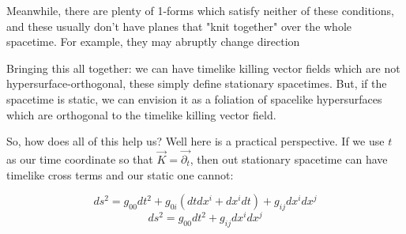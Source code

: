 \documentclass[11pt,table]{article}
\begin{document}
            Meanwhile, there are plenty of 1-forms which satisfy neither of these conditions, and these usually don't have planes that "knit together" over the whole spacetime. For example, they may abruptly change direction
            \vspace{.25in}
            \begin{center}
    




            \end{center}
            Bringing this all together: we can have timelike killing vector fields which are not hypersurface-orthogonal, these simply define stationary spacetimes.  But, if the spacetime is static, we can envision it as a foliation of spacelike hypersurfaces which are orthogonal to the timelike killing vector field.

            So, how does all of this help us?  Well here is a practical perspective.  If we use $t$ as our time coordinate so that $\Vec{K} = \vec{\partial_t}$, then out stationary spacetime can have timelike cross terms and our static one cannot:

            \begin{equation}
                ds^2=g_{00}dt^2 + g_{0i}(dtdx^i+dx^idt)+g_{ij}dx^idx^j\tag{stationary}
            \end{equation}
            \begin{equation}
                ds^2=g_{00}dt^2 +g_{ij}dx^idx^j\tag{static}
            \end{equation}
            \vspace{.25in}
\end{document}
